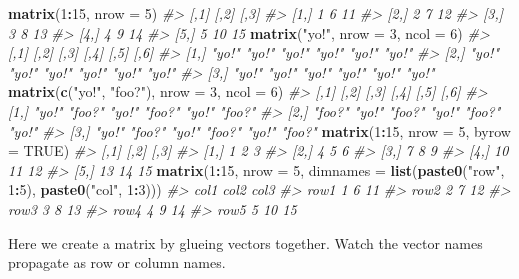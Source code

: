 \documentclass[
]{book}
\newenvironment{Shaded}{\begin{snugshade}}{\end{snugshade}}
\newcommand{\CommentTok}[1]{\textcolor[rgb]{0.56,0.35,0.01}{\textit{#1}}}
\newcommand{\DataTypeTok}[1]{\textcolor[rgb]{0.13,0.29,0.53}{#1}}
\newcommand{\DecValTok}[1]{\textcolor[rgb]{0.00,0.00,0.81}{#1}}
\newcommand{\KeywordTok}[1]{\textcolor[rgb]{0.13,0.29,0.53}{\textbf{#1}}}
\newcommand{\NormalTok}[1]{#1}
\newcommand{\OperatorTok}[1]{\textcolor[rgb]{0.81,0.36,0.00}{\textbf{#1}}}
\newcommand{\OtherTok}[1]{\textcolor[rgb]{0.56,0.35,0.01}{#1}}
\newcommand{\StringTok}[1]{\textcolor[rgb]{0.31,0.60,0.02}{#1}}
\begin{document}
\begin{Shaded}
\begin{Highlighting}[]
\KeywordTok{matrix}\NormalTok{(}\DecValTok{1}\OperatorTok{:}\DecValTok{15}\NormalTok{, }\DataTypeTok{nrow =} \DecValTok{5}\NormalTok{)}
\CommentTok{#>      [,1] [,2] [,3]}
\CommentTok{#> [1,]    1    6   11}
\CommentTok{#> [2,]    2    7   12}
\CommentTok{#> [3,]    3    8   13}
\CommentTok{#> [4,]    4    9   14}
\CommentTok{#> [5,]    5   10   15}
\KeywordTok{matrix}\NormalTok{(}\StringTok{"yo!"}\NormalTok{, }\DataTypeTok{nrow =} \DecValTok{3}\NormalTok{, }\DataTypeTok{ncol =} \DecValTok{6}\NormalTok{)}
\CommentTok{#>      [,1]  [,2]  [,3]  [,4]  [,5]  [,6] }
\CommentTok{#> [1,] "yo!" "yo!" "yo!" "yo!" "yo!" "yo!"}
\CommentTok{#> [2,] "yo!" "yo!" "yo!" "yo!" "yo!" "yo!"}
\CommentTok{#> [3,] "yo!" "yo!" "yo!" "yo!" "yo!" "yo!"}
\KeywordTok{matrix}\NormalTok{(}\KeywordTok{c}\NormalTok{(}\StringTok{"yo!"}\NormalTok{, }\StringTok{"foo?"}\NormalTok{), }\DataTypeTok{nrow =} \DecValTok{3}\NormalTok{, }\DataTypeTok{ncol =} \DecValTok{6}\NormalTok{)}
\CommentTok{#>      [,1]   [,2]   [,3]   [,4]   [,5]   [,6]  }
\CommentTok{#> [1,] "yo!"  "foo?" "yo!"  "foo?" "yo!"  "foo?"}
\CommentTok{#> [2,] "foo?" "yo!"  "foo?" "yo!"  "foo?" "yo!" }
\CommentTok{#> [3,] "yo!"  "foo?" "yo!"  "foo?" "yo!"  "foo?"}
\KeywordTok{matrix}\NormalTok{(}\DecValTok{1}\OperatorTok{:}\DecValTok{15}\NormalTok{, }\DataTypeTok{nrow =} \DecValTok{5}\NormalTok{, }\DataTypeTok{byrow =} \OtherTok{TRUE}\NormalTok{)}
\CommentTok{#>      [,1] [,2] [,3]}
\CommentTok{#> [1,]    1    2    3}
\CommentTok{#> [2,]    4    5    6}
\CommentTok{#> [3,]    7    8    9}
\CommentTok{#> [4,]   10   11   12}
\CommentTok{#> [5,]   13   14   15}
\KeywordTok{matrix}\NormalTok{(}\DecValTok{1}\OperatorTok{:}\DecValTok{15}\NormalTok{, }\DataTypeTok{nrow =} \DecValTok{5}\NormalTok{,}
       \DataTypeTok{dimnames =} \KeywordTok{list}\NormalTok{(}\KeywordTok{paste0}\NormalTok{(}\StringTok{"row"}\NormalTok{, }\DecValTok{1}\OperatorTok{:}\DecValTok{5}\NormalTok{),}
                       \KeywordTok{paste0}\NormalTok{(}\StringTok{"col"}\NormalTok{, }\DecValTok{1}\OperatorTok{:}\DecValTok{3}\NormalTok{)))}
\CommentTok{#>      col1 col2 col3}
\CommentTok{#> row1    1    6   11}
\CommentTok{#> row2    2    7   12}
\CommentTok{#> row3    3    8   13}
\CommentTok{#> row4    4    9   14}
\CommentTok{#> row5    5   10   15}
\end{Highlighting}
\end{Shaded}

Here we create a matrix by glueing vectors together. Watch the vector names propagate as row or column names.
\end{document}
